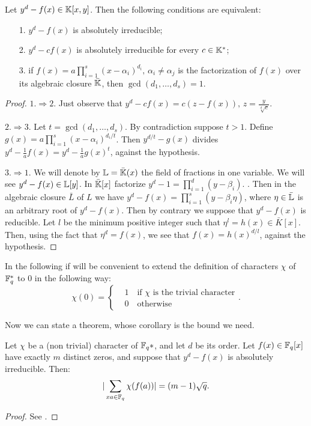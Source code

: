 \begin{lemma}\label{tre}
	Let $y^d-f(x)\in {\mathbb K}[x,y]$. Then the following conditions are equivalent:
	\begin{itemize}
	\item[1.] $y^d-f(x)$ is absolutely irreducible;
	\item[2.] $y^d-cf(x)$ is absolutely irreducible for every $c \in {\mathbb K}^{*}$;
	\item[3.] if $f(x)=a \prod_{i=1}^s (x-\alpha_i)^{d_i}, \, \alpha_i \neq \alpha_j$ is the factorization of $f(x)$ over
	 its algebraic closure $\bar{{\mathbb K}}$, then $\gcd(d_1,\dots ,d_s)=1$.
	\end{itemize}
\begin{proof}
$1. \Rightarrow 2.$ Just observe that $y^d-cf(x)=c(z-f(x)),\, z=\frac{y}{\sqrt[d]{c}}$.

$2. \Rightarrow 3.$ Let $t=\gcd(d_1,\dots ,d_s)$. By contradiction suppose $t > 1$.
Define $g(x)=a \prod_{i=1}^s (x-\alpha_i)^{d_i/t}$. Then $y^{d/t}-g(x)$ divides $y^d-\frac{1}{a}f(x)=y^d-\frac{1}{a}g(x)^t$,
against the hypothesis.

$3. \Rightarrow 1.$ We will denote by ${\mathbb L}=\bar{{\mathbb K}}(x)$ the field of fractions in one variable.
We will see $y^d-f(x) \in {\mathbb L}[y]$.
In $\bar{{\mathbb K}}[x]$ factorize $y^d-1=\prod_{i=1}^d (y-\beta_i)$.  .
Then in the algebraic closure $\bar{L}$ of $L$ we have $y^d-f(x)=\prod_{i=1}^{s}(y-\beta_i \eta)$,
where $\eta \in \bar{{\mathbb L}}$ is an arbitrary root of $y^d-f(x)$.
Then by contrary we suppose that $y^d-f(x)$ is reducible. Let $l$ be the minimum positive integer such that
$\eta^l=h(x)\in \bar{K}[x]$. Then, using the fact that $\eta^d=f(x)$, we see that $f(x)=h(x)^{d/l}$, against the hypothesis. 
\end{proof}
\end{lemma}
In the following if will be  convenient to extend the definition of characters $\chi$ of ${\mathbb F}_q^{*}$
to 0 in the following way:
\begin{equation*}
	\chi (0)=\begin{cases}&1\quad \text{if $\chi$ is the trivial character}\\ &0 \quad\text{otherwise} \end{cases}.
\end{equation*}

Now we can state a theorem, whose corollary is the bound we need.
\begin{theorem}
Let $\chi$ be a (non trivial) character of ${\mathbb F}_q{*}$, and let $d$ be its order. Let $f(x) \in {\mathbb F}_q[x]$ have exactly
$m$ distinct zeros, and suppose that $y^d-f(x)$ is absolutely irreducible. Then:
\begin{equation}
	\vert \sum_{xa \in {\mathbb F}_q} \chi (f(a)) \vert=(m-1)\sqrt{q}. 
\end{equation}
\begin{proof}
	See \cite{schmidt1976equations}.
\end{proof}
\end{theorem}

